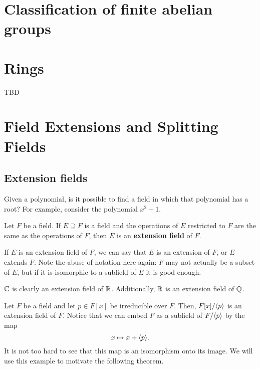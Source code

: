 \documentclass[oneside]{book}
\begin{document}
\chapter{Classification of finite abelian groups}
\label{chapter:classification-of-finite-abelian-groups}


\chapter{Rings}
TBD
 
\chapter{Field Extensions and Splitting Fields}

\section{Extension fields}
Given a polynomial, is it possible to find a field in which that polynomial has
a root? For example, consider the polynomial $x^2 + 1$. 

\begin{definition}
    Let $F$ be a field. If $E \supseteq F$ is a field and the operations of $E$
    restricted to $F$ are the same as the operations of $F$, then $E$ is an
    \textbf{extension field} of $F$.
\end{definition}
If $E$ is an extension field of $F$, we can say that $E$ is an extension of $F$,
or $E$ extends $F$. Note the abuse of notation here again: $F$ may not actually
be a subset of $E$, but if it is isomorphic to a subfield of $E$ it is good
enough.

\begin{example}
    $\mathbb{C}$ is clearly an extension field of $\mathbb{R}$. Additionally, $\mathbb{R}$ is an
    extension field of $\mathbb{Q}$.
\end{example}

\begin{example}
    Let $F$ be a field and let $p \in F[x]$ be irreducible over $F$. Then,
    $F[x]/{ \langle p \rangle }$ is an extension field of $F$. Notice that we can embed $F$ as
    a subfield of $F/{ \langle p \rangle }$ by the map 
    \[
        x \mapsto x + { \langle p \rangle }.
    \]
    It is not too hard to see that this map is an isomorphism onto its image. We
    will use this example to motivate the following theorem.
\end{example}
\end{document}
